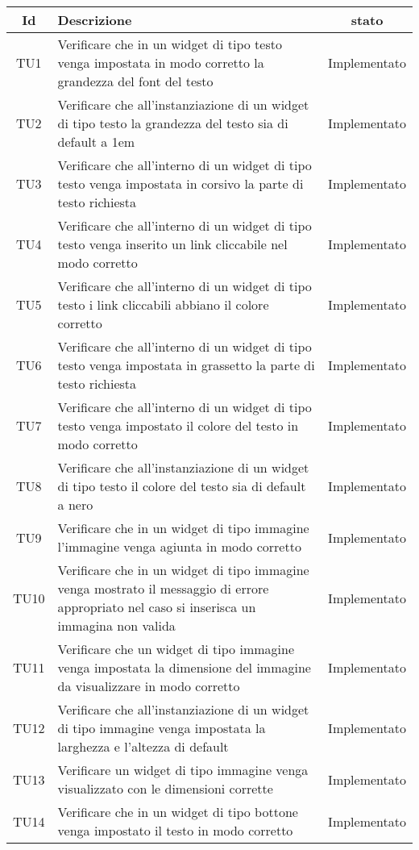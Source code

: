 \begin{center}
	\begin{longtable}{|c|>{\centering}m{10cm}|c|}\hline
		Id & Descrizione & stato \\ \hline
		TU1 & Verificare che in un widget di tipo testo venga impostata in modo corretto la grandezza del font del testo & Implementato \\ \hline
		TU2 & Verificare che all'instanziazione di un widget di tipo testo la grandezza del testo sia di default a 1em & Implementato \\ \hline
		TU3 & Verificare che all'interno di un widget di tipo testo venga impostata in corsivo la parte di testo richiesta & Implementato \\ \hline
		TU4 & Verificare che all'interno di un widget di tipo testo venga inserito un link cliccabile nel modo corretto & Implementato \\ \hline
		TU5 & Verificare che all'interno di un widget di tipo testo i link cliccabili abbiano il colore corretto & Implementato \\ \hline
		TU6 & Verificare che all'interno di un widget di tipo testo venga impostata in grassetto la parte di testo richiesta & Implementato \\ \hline
		TU7 & Verificare che all'interno di un widget di tipo testo venga impostato il colore del testo in modo corretto & Implementato \\ \hline
		TU8 & Verificare che all'instanziazione di un widget di tipo testo il colore del testo sia di default a nero & Implementato \\ \hline
		TU9 & Verificare che in un widget di tipo immagine l'immagine venga agiunta in modo corretto & Implementato \\ \hline
		TU10 & Verificare che in un widget di tipo immagine venga mostrato il messaggio di errore appropriato nel caso si inserisca un immagina non valida & Implementato \\ \hline
		TU11 & Verificare che un widget di tipo immagine venga impostata la dimensione del immagine da visualizzare in modo corretto & Implementato \\ \hline
		TU12 & Verificare che all'instanziazione di un widget di tipo immagine venga impostata la larghezza e l'altezza di default & Implementato \\ \hline
		TU13 & Verificare un widget di tipo immagine venga visualizzato con le dimensioni corrette & Implementato \\ \hline
		TU14 & Verificare che in un widget di tipo bottone venga impostato il testo in modo corretto & Implementato \\ \hline

\end{longtable}
\end{center}
